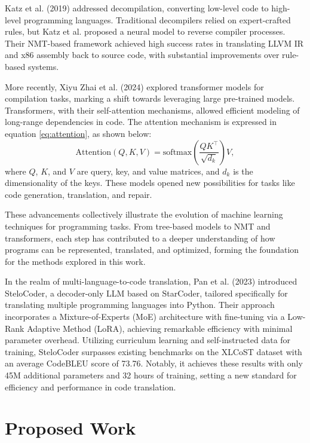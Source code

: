 \documentclass{dhbenelux}
\begin{document}
Katz et al. (2019) \cite{katz2019}addressed decompilation, converting low-level code to high-level programming languages. Traditional decompilers relied on expert-crafted rules, but Katz et al. proposed a neural model to reverse compiler processes. Their NMT-based framework achieved high success rates in translating LLVM IR and x86 assembly back to source code, with substantial improvements over rule-based systems. 

More recently, Xiyu Zhai et al. (2024) \cite{xiyu2024} explored transformer models for compilation tasks, marking a shift towards leveraging large pre-trained models. Transformers, with their self-attention mechanisms, allowed efficient modeling of long-range dependencies in code. The attention mechanism is expressed in equation \ref{eq:attention}, as shown below:
\begin{equation}
\text{Attention}(Q, K, V) = \text{softmax}\left(\frac{QK^\top}{\sqrt{d_k}}\right)V,
\label{eq:attention}
\end{equation}
where \( Q \), \( K \), and \( V \) are query, key, and value matrices, and \( d_k \) is the dimensionality of the keys. These models opened new possibilities for tasks like code generation, translation, and repair.



These advancements collectively illustrate the evolution of machine learning techniques for programming tasks. From tree-based models to NMT and transformers, each step has contributed to a deeper understanding of how programs can be represented, translated, and optimized, forming the foundation for the methods explored in this work.

In the realm of multi-language-to-code translation, Pan et al. (2023) \cite{pan2023} introduced SteloCoder, a decoder-only LLM based on StarCoder, tailored specifically for translating multiple programming languages into Python. Their approach incorporates a Mixture-of-Experts (MoE) architecture with fine-tuning via a Low-Rank Adaptive Method (LoRA), achieving remarkable efficiency with minimal parameter overhead. Utilizing curriculum learning and self-instructed data for training, SteloCoder surpasses existing benchmarks on the XLCoST dataset \cite{xlcost2022} with an average CodeBLEU score of 73.76. Notably, it achieves these results with only 45M additional parameters and 32 hours of training, setting a new standard for efficiency and performance in code translation.

\section{Proposed Work}
\end{document}
